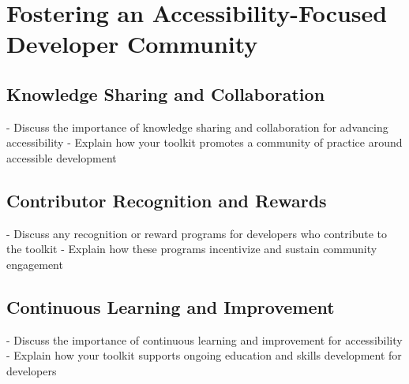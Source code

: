 \section{Fostering an Accessibility-Focused Developer Community}
\label{sec:community}
\subsection{Knowledge Sharing and Collaboration}
- Discuss the importance of knowledge sharing and collaboration for advancing accessibility
- Explain how your toolkit promotes a community of practice around accessible development

\subsection{Contributor Recognition and Rewards}
- Discuss any recognition or reward programs for developers who contribute to the toolkit
- Explain how these programs incentivize and sustain community engagement

\subsection{Continuous Learning and Improvement}
- Discuss the importance of continuous learning and improvement for accessibility
- Explain how your toolkit supports ongoing education and skills development for developers

\newpage




% 

